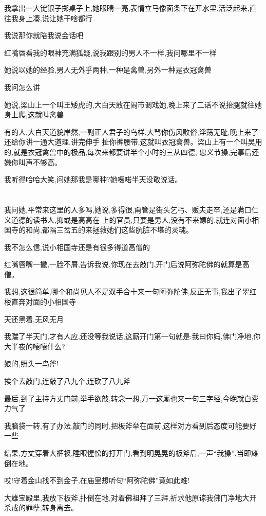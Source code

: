 ﻿\documentclass[12pt]{article}
\begin{document}
我拿出一大锭银子掷桌子上,她眼睛一亮,表情立马像面条下在开水里,活泛起来,直往我身上凑,说让她干啥都行

我说那你就陪我说会话吧

红嘴唇看我的眼神充满狐疑,说我跟别的男人不一样,我问哪里不一样

她说以她的经验,男人无外乎两种,一种是禽兽,另外一种是衣冠禽兽

我问怎么讲

她说,梁山上一个叫王矮虎的,大白天敢在闹市调戏她,晚上来了二话不说抬腿就往她身上爬,这就叫禽兽

有的人,大白天道貌岸然,一副正人君子的鸟样,大骂你伤风败俗,淫荡无耻,晚上来了还给你讲一通大道理,讲完伸手
扯你裤腰带,这就叫衣冠禽兽。梁山上有一个叫吴用的,就是衣冠禽兽中的极品,每次来都要讲半个小时的三从四德,
忠义节操,完事后还嫌你叫声不够高。

我听得哈哈大笑,问她那我是哪种?她嗫喏半天没敢说话。

\section{}

我问她,平常来这里的人多吗,她说,多得很,甭管是街头乞丐、贩夫走卒,还是满口仁义道德的读书人,抑或是高高在
上的官员,只要是男人,没有不来嫖的,就连对面小相国寺的和尚,都隔三岔五的来拯救她们这些肮脏不堪的灵魂。

我不怎么信,说小相国寺还是有很多得道高僧的

红嘴唇嘴一撇,一脸不屑,告诉我说,你现在去敲门,开门后说阿弥陀佛的就算是高僧。

我想,这很简单,哪个和尚见人不是双手合十来一句阿弥陀佛,反正无事,我出了翠红楼直奔对面的小相国寺

天还黑着,无风无月

我踹了半天门,才有人应,还没等我说话,这厮开门第一句就是:我曰你妈,佛门净地,你大半夜的嚷嚷什么?

娘的,照头一鸟斧!

挨个去敲门,连敲了八九个,连砍了八九斧

最后,到了主持方丈门前,举手欲敲,转念一想,万一这厮也来一句三字经,今晚就白费力气了

我脑袋一转,有了办法,敲门的同时,把板斧举在面前,这样对方看到后态度可能要好一些

结果,方丈穿着大裤衩,睡眼惺忪的打开门,看到明晃晃的板斧后,一声``我操'',当即瘫倒在地。

哎!守着金山找不到金子,在庙里想听句``阿弥陀佛''竟如此难!

大雄宝殿里,我放下板斧,扑倒在地,对着佛祖拜了三拜,祈求他原谅我佛门净地大开杀戒的罪孽,转身离去。
\end{document}
